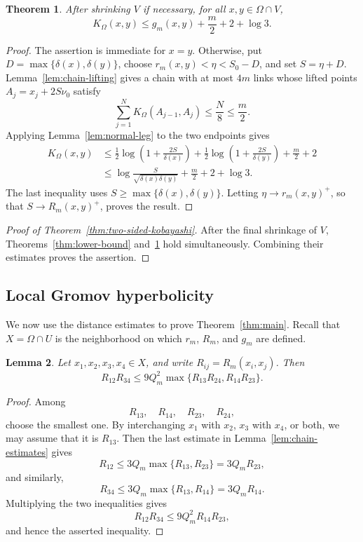\documentclass[11pt]{article}
\newtheorem{theorem}{Theorem}[section]
\newtheorem{lemma}[theorem]{Lemma}
\theoremstyle{definition}
\begin{document}
\begin{theorem}\label{thm:upper-bound}
After shrinking \(V\) if necessary, for all \(x,y\in\Omega\cap V\),
\[
K_\Omega(x,y)\le g_m(x,y)+\frac m2+2+\log3.
\]
\end{theorem}
\begin{proof}
The assertion is immediate for \(x=y\). Otherwise, put
\(D=\max\{\delta(x),\delta(y)\}\), choose
\(r_m(x,y)<\eta<S_0-D\), and set \(S=\eta+D\).
Lemma~\ref{lem:chain-lifting} gives a chain with at most \(4m\) links
whose lifted points \(A_j=x_j+2S\nu_0\) satisfy
\[
\sum_{j=1}^N K_\Omega(A_{j-1},A_j)\le\frac{N}{8}\le\frac m2.
\]
Applying Lemma~\ref{lem:normal-leg} to the two endpoints gives
\[
\begin{aligned}
K_\Omega(x,y)
&\le\frac12\log\left(1+\frac{2S}{\delta(x)}\right)
+\frac12\log\left(1+\frac{2S}{\delta(y)}\right)
+\frac m2+2\\
&\le\log\frac S{\sqrt{\delta(x)\delta(y)}}+\frac m2+2+\log3.
\end{aligned}
\]
The last inequality uses \(S\ge\max\{\delta(x),\delta(y)\}\).
Letting \(\eta\to r_m(x,y)^+\), so that \(S\to R_m(x,y)^+\),
proves the result.
\end{proof}
\begin{proof}[Proof of Theorem~\ref{thm:two-sided-kobayashi}]
After the final shrinkage of \(V\), Theorems~\ref{thm:lower-bound}
and~\ref{thm:upper-bound} hold simultaneously. Combining their
estimates proves the assertion.
\end{proof}

\subsection{Local Gromov hyperbolicity}
\label{subsec:gromov-hyperbolicity}

We now use the distance estimates to prove Theorem~\ref{thm:main}.
Recall that \(X=\Omega\cap U\) is the neighborhood on which
\(r_m\), \(R_m\), and \(g_m\) are defined.

\begin{lemma}\label{lem:multiplicative-four-point}
Let \(x_1,x_2,x_3,x_4\in X\), and write
\(R_{ij}=R_m(x_i,x_j)\).
Then
\begin{equation*}
R_{12}R_{34}
\le
9Q_m^2
\max\{R_{13}R_{24},R_{14}R_{23}\}.
\end{equation*}
\end{lemma}

\begin{proof}
Among
\[
R_{13},\quad R_{14},\quad R_{23},\quad R_{24},
\]
choose the smallest one.  By interchanging \(x_1\) with \(x_2\),
\(x_3\) with \(x_4\), or both, we may assume that it is \(R_{13}\).
Then the last estimate in Lemma~\ref{lem:chain-estimates} gives
\[
R_{12}
\le
3Q_m\max\{R_{13},R_{23}\}
=
3Q_mR_{23},
\]
and similarly,
\[
R_{34}
\le
3Q_m\max\{R_{13},R_{14}\}
=
3Q_mR_{14}.
\]
Multiplying the two inequalities gives
\[
R_{12}R_{34}
\le
9Q_m^2R_{14}R_{23},
\]
and hence the asserted inequality.
\end{proof}
\end{document}
